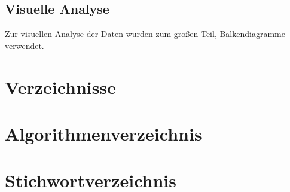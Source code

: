\documentclass[13pt,a4paper, listof=entryprefix, bibliography=totocnumbered,toc=listofnumbered,lof=listofnumbered]{scrartcl}
\newcounter{verzeichnis}
\begin{document}
	

	\subsection{Visuelle Analyse}
		\label{ch:visuelle_analyse}

	Zur visuellen Analyse der Daten wurden zum großen Teil, Balkendiagramme verwendet. 

	

		\pagebreak

		 \label{Verzeichnisse}
		\renewcommand{\thesection}{\Roman{verzeichnis}}
		\section*{Verzeichnisse}
   		 \label{Literaturverzeichnis}
		\renewcommand{\refname}{Literaturverzeichnis}
		\printbibliography
		\pagebreak

		\listoffigures
		\pagebreak


		\listoftables
		\pagebreak

        \lstlistoflistings
        \pagebreak


        \section{Algorithmenverzeichnis}
        \vspace{-2em}



\pagebreak
{}
\section{Stichwortverzeichnis}
\end{document}
